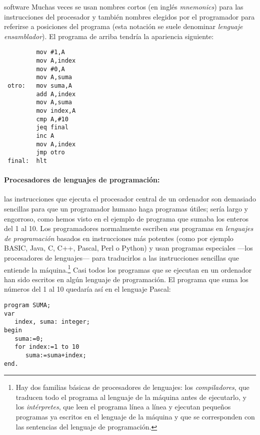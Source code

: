 \begin{persabermes}{software}
Muchas veces se usan nombres cortos (en inglés \emph{mnemonics}) para las instrucciones del procesador y también nombres elegidos por el programador para referirse a posiciones del programa (esta notación se suele denominar \emph{lenguaje ensamblador}). El programa de arriba tendría la apariencia siguiente: 
\begin{verbatim} 
         mov #1,A
         mov A,index
         mov #0,A
         mov A,suma
 otro:   mov suma,A
         add A,index
         mov A,suma
         mov index,A
         cmp A,#10
         jeq final
         inc A
         mov A,index
         jmp otro
 final:  hlt
\end{verbatim}


\paragraph{Procesadores de lenguajes de programación:} las instrucciones que ejecuta el procesador central de un ordenador son demasiado sencillas para que un programador humano haga programas útiles; sería largo y engorroso, como hemos visto en el ejemplo de programa que sumaba los enteros del 1 al 10. Los programadores normalmente escriben sus programas en {\em lenguajes de programación} basados en instrucciones más potentes (como por ejemplo BASIC, Java, C, C++, Pascal, Perl o Python) y usan programas especiales ---los procesadores de lenguajes--- para traducirlos a las instrucciones sencillas que entiende la máquina.\footnote{Hay dos familias básicas de procesadores de lenguajes: los \emph{compiladores}, que traducen todo el programa al lenguaje de la máquina antes de ejecutarlo, y los \emph{intérpretes}, que leen el programa línea a línea y ejecutan pequeños programas ya escritos en el lenguaje de la máquina y que se corresponden con las sentencias del lenguaje de programación.} Casi todos los programas que se ejecutan en un ordenador han sido escritos en algún lenguaje de programación. El programa que suma los números del 1 al 10 quedaría así en el lenguaje Pascal: 
\begin{verbatim}
program SUMA;
var
   index, suma: integer;
begin
   suma:=0;
   for index:=1 to 10
      suma:=suma+index;
end.
\end{verbatim}


\end{persabermes}
